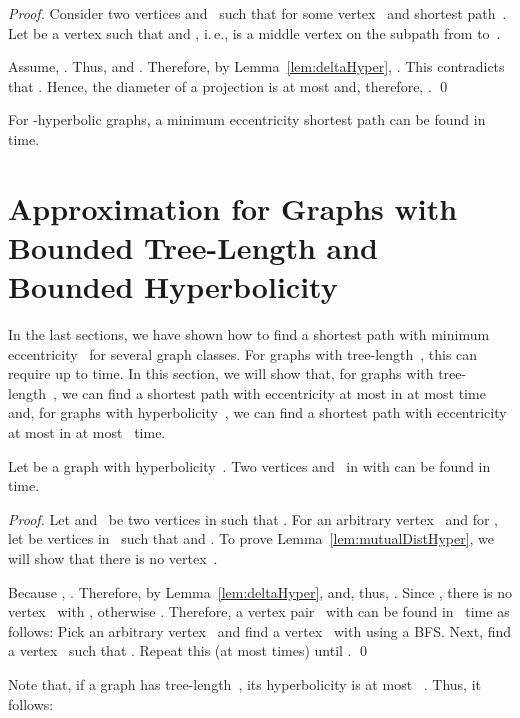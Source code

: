 \documentclass[10pt]{llncs}
\makeatletter
\newcommand{\ie}{i.\,e.\@ifnextchar{,}{}{~}}
\makeatother
\begin{document}
\begin{proof}
Consider two vertices  and~ such that  for some vertex~ and shortest path~.
Let  be a vertex such that  and , \ie,  is a middle vertex on the subpath from  to~.

Assume, .
Thus,  and .
Therefore, by Lemma~\ref{lem:deltaHyper}, .
This contradicts that .
Hence, the diameter of a projection is at most  and, therefore, .
\qed
\end{proof}

\begin{corollary}
For -hyperbolic graphs, a minimum eccentricity shortest path can be found in  time.
\end{corollary}

\section{Approximation for Graphs with Bounded Tree-Length and Bounded Hyperbolicity}

In the last sections, we have shown how to find a shortest path with minimum eccentricity~ for several graph classes.
For graphs with tree-length~, this can require up to  time.
In this section, we will show that, for graphs with tree-length~, we can find a shortest path with eccentricity at most  in at most  time and, for graphs with hyperbolicity~, we can find a shortest path with eccentricity at most  in at most ~time.

\begin{lemma}
    \label{lem:mutualDistHyper}
Let  be a graph with hyperbolicity~.
Two vertices  and~ in  with  can be found in  time.
\end{lemma}

\begin{proof}
Let  and~ be two vertices in  such that .
For an arbitrary vertex~ and for , let  be vertices in~ such that  and .
To prove Lemma~\ref{lem:mutualDistHyper}, we will show that there is no vertex~.

Because , .
Therefore, by Lemma~\ref{lem:deltaHyper},  and, thus, .
Since , there is no vertex~ with , otherwise .
Therefore, a vertex pair~ with  can be found in ~time as follows:
Pick an arbitrary vertex~ and find a vertex~ with  using a BFS.
Next, find a vertex~ such that .
Repeat this (at most  times) until .
\qed
\end{proof}

Note that, if a graph has tree-length~, its hyperbolicity is at most ~\cite{CheDraEstHab2008}.
Thus, it follows:
\end{document}
